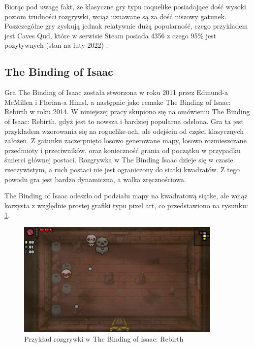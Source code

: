 \documentclass[12pt,twoside]{article}
\begin{document}
Biorąc pod uwagę fakt, że klasyczne gry typu roquelike posiadające dość wysoki poziom trudności rozgrywki, wciąż uznawane są za dość niszowy gatunek. Poszczególne gry zyskują jednak relatywnie dużą popularność, czego przykladem jest Caves Qud, które w serwisie Steam posiada 4356 z czego 95\% jest pozytywnych (stan na luty 2022) \cite{coq_steam}.



\subsection{The Binding of Isaac}

Gra The Binding of Isaac została stworzona w roku 2011 przez Edmund-a McMillen i Florian-a Himsl, a następnie jako remake The Binding of Isaac: Rebirth w roku 2014. W niniejszej pracy skupiono się na omówieniu The Binding of Isaac: Rebirth, gdyż jest to nowsza i bardziej popularna odsłona. Gra ta jest przykładem wzorowania się na roguelike-ach, ale odejściu od części klasycznych założen. Z gatunku zaczerpnięto losowo generowane mapy, losowo rozmieszczane przedmioty i przeciwników, oraz konieczność grania od początku w przypadku śmierci głównej postaci. Rozgrywka w The Binding Isaac dzieje się w czasie rzeczywistym, a ruch postaci nie jest ograniczony do siatki kwadratów. Z tego powodu gra jest bardzo dynamiczna, a walka zręcznościowa.

The Binding of Isaac odeszło od podziału mapy na kwadratową siątke, ale wciąż korzysta z względnie prostej grafiki typu pixel art, co przedstawiono na rysunku: \ref{tboi:scr1}.

\FloatBarrier
\begin{figure}[h]
	\centering
	\includegraphics[width=10cm]{images/tboi/scr1.png}
	\caption{Przykład rozgrywki w The Binding of Isaac: Rebirth}
	\label{tboi:scr1}
\end{figure}
\FloatBarrier
\end{document}
